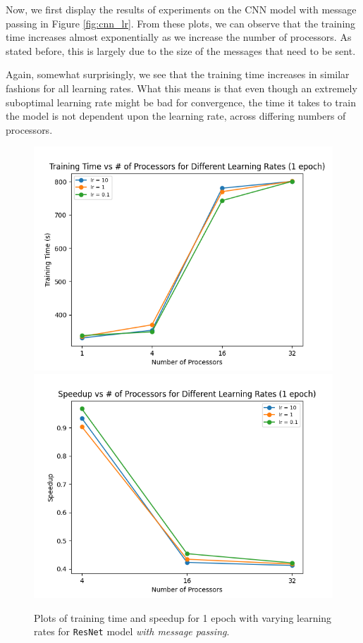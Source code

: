 \documentclass{article}
\begin{document}
Now, we first display the results of experiments on the CNN model with message passing in Figure \ref{fig:cnn_lr}. From these plots, we can observe that the training time increases almost exponentially as we increase the number of processors. As stated before, this is largely due to the size of the messages that need to be sent.

Again, somewhat surprisingly, we see that the training time increases in similar fashions for all learning rates. What this means is that even though an extremely suboptimal learning rate might be bad for convergence, the time it takes to train the model is not dependent upon the learning rate, across differing numbers of processors.

\begin{figure}[!h]
    \centering
    \includegraphics[scale=0.5]{res_lr_time}
    \includegraphics[scale=0.5]{res_lr_speed}
    \caption{Plots of training time and speedup for 1 epoch with varying learning rates for \texttt{ResNet} model \textit{with message passing}.}
    \label{fig:res_lr}
\end{figure}
\end{document}
